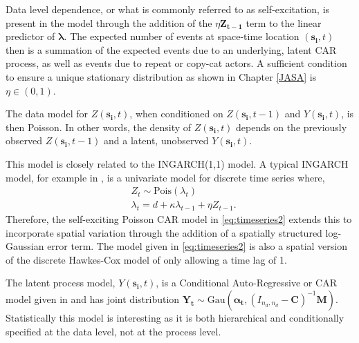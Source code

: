 \documentclass[11pt]{isuthesis}
\begin{document}
	Data level dependence, or what is commonly referred to as self-excitation, is present in the model through the addition of the $\eta \boldsymbol{Z_{t-1}}$ term to the linear predictor of $\boldsymbol{\lambda}$.  The expected number of events at space-time location $(\boldsymbol{s_i},t)$ then is a summation of the expected events due to an underlying, latent CAR process, as well as events due to repeat or copy-cat actors.  A sufficient condition to ensure a unique stationary distribution as shown in Chapter \ref{JASA} is $\eta \in (0,1)$.  
	
	The data model for $Z(\boldsymbol{s_i},t)$, when conditioned on $Z(\boldsymbol{s_i},t-1)$ and $Y(\boldsymbol{s_i},t)$, is then Poisson.  In other words, the density of $Z(\boldsymbol{s_i},t)$ depends on the previously observed $Z(\boldsymbol{s_i},t-1)$ and a latent, unobserved $Y(\boldsymbol{s_i},t)$.
	
	This model is closely related to the INGARCH(1,1) model.  A typical INGARCH model, for example in \cite{davis2016handbook}, is a univariate model for discrete time series where,
	\begin{align}
	& Z_t \sim \mbox{Pois}(\lambda_t) \label{eq:INGARH} \\
	&\lambda_t= d+\kappa \lambda_{t-1}+\eta Z_{t-1}.
	\end{align}
	Therefore, the self-exciting Poisson CAR model in \eqref{eq:timeseries2} extends this to incorporate spatial variation through the addition of a spatially structured log-Gaussian error term.  The model given in \eqref{eq:timeseries2} is also a spatial version of the discrete Hawkes-Cox model of \cite{mohler2013modeling} only allowing a time lag of 1.
	
	The latent process model, $Y(\boldsymbol{s_i},t)$, is a Conditional Auto-Regressive or CAR model given in \cite{cressie2015statistics} and has joint distribution $\boldsymbol{Y_t}\sim \mbox{Gau}(\boldsymbol{\alpha_t},(I_{{n_d},{n_d}}-\boldsymbol{C})^{-1}\boldsymbol{M})$. Statistically this model is interesting as it is both hierarchical and conditionally specified at the data level, not at the process level.  
	
\end{document}
